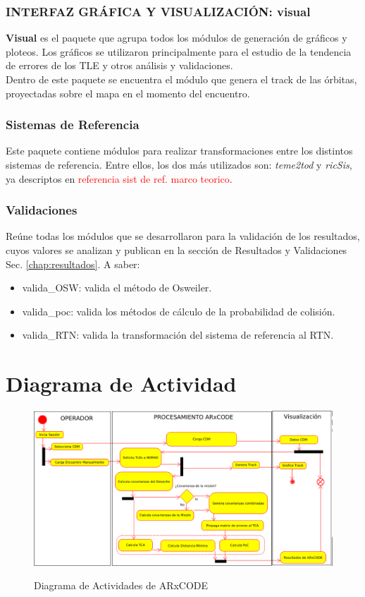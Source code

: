 \subsubsection*{INTERFAZ GR\'AFICA Y VISUALIZACI\'ON: visual}
{\bf{Visual}} es el paquete que agrupa todos los m\'odulos de generaci\'on de gr\'aficos y ploteos. Los gr\'aficos se utilizaron principalmente para el estudio de la tendencia de errores de los TLE y otros an\'alisis y validaciones.\\
Dentro de este paquete se encuentra el m\'odulo que genera el track de las \'orbitas, proyectadas sobre el mapa en el momento del encuentro.\\

\subsubsection*{Sistemas de Referencia}
Este paquete contiene m\'odulos para realizar transformaciones entre los distintos sistemas de referencia. Entre ellos, los dos m\'as utilizados son:
{\it{teme2tod}} y {\it{ricSis}}, ya descriptos en \textcolor{red}{referencia sist de ref. marco teorico}.

\subsubsection*{Validaciones}
Re\'une todas los m\'odulos que se desarrollaron para la validaci\'on de los resultados, cuyos valores se analizan y publican en la secci\'on de Resultados y Validaciones Sec. \ref{chap:resultados}. A saber:

\begin{itemize}
 \item valida\_OSW: valida el m\'etodo de Osweiler.
 \item valida\_poc: valida los m\'etodos de c\'alculo de la probabilidad de colisi\'on.
 \item valida\_RTN: valida la transformaci\'on del sistema de referencia al RTN.
\end{itemize}


\section{Diagrama de Actividad}


\begin{figure}[h!]
  \centering
  \includegraphics[width=\textwidth]{imagenes/actdiagAR}
  \label{fig:actdiag}
  \caption{Diagrama de Actividades de ARxCODE}
\end{figure}



